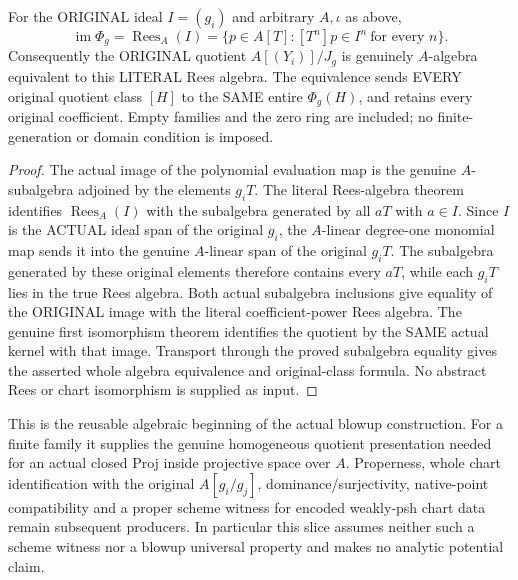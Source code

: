 \begin{theorem}
\label{algebra:actual-rees-image-and-quotient}
\leanok
{}
For the ORIGINAL ideal $I=(g_i)$ and arbitrary $A,\iota$ as above,
\[
 \operatorname{im}\Phi_g=\operatorname{Rees}_A(I)
 =\{p\in A[T]:[T^n]p\in I^n\ \text{for every }n\}.
\]
Consequently the ORIGINAL quotient $A[(Y_i)]/J_g$ is genuinely
$A$-algebra equivalent to this LITERAL Rees algebra. The equivalence sends
EVERY original quotient class $[H]$ to the SAME entire $\Phi_g(H)$,
and retains every original coefficient. Empty families and the zero ring
are included; no finite-generation or domain condition is imposed.
\end{theorem}
\begin{proof}
The actual image of the polynomial evaluation map is the genuine $A$-subalgebra
adjoined by the elements $g_iT$. The literal Rees-algebra theorem identifies
$\operatorname{Rees}_A(I)$ with the subalgebra generated by all $aT$ with
$a\in I$. Since $I$ is the ACTUAL ideal span of the original $g_i$, the
$A$-linear degree-one monomial map sends it into the genuine $A$-linear span
of the original $g_iT$. The subalgebra generated by these original elements
therefore contains every $aT$, while each $g_iT$ lies in the true Rees algebra.
Both actual subalgebra inclusions give equality of the ORIGINAL image with
the literal coefficient-power Rees algebra. The genuine first isomorphism
theorem identifies the quotient by the SAME actual kernel with that image.
Transport through the proved subalgebra equality gives the asserted whole
algebra equivalence and original-class formula. No abstract Rees or chart
isomorphism is supplied as input.
\end{proof}

\begin{remark}
This is the reusable algebraic beginning of the actual blowup construction.
For a finite family it supplies the genuine homogeneous quotient presentation
needed for an actual closed Proj inside projective space over $A$.
Properness, whole chart identification with the original $A[g_i/g_j]$,
dominance/surjectivity, native-point compatibility and a proper scheme witness
for encoded weakly-psh chart data remain subsequent producers. In particular
this slice assumes neither such a scheme witness nor a blowup universal property
and makes no analytic potential claim.
\end{remark}
